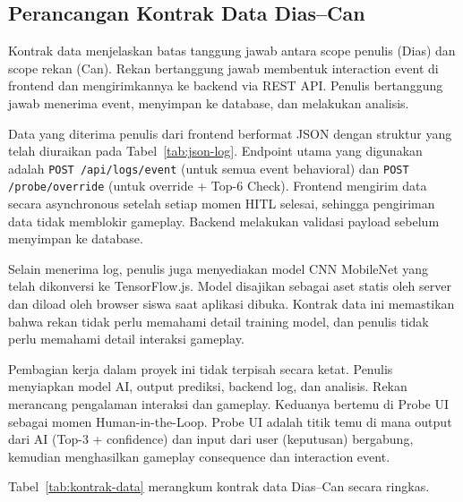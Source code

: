 \documentclass[12pt,a4paper,oneside,openany]{report}
\begin{document}
\subsection{Perancangan Kontrak Data Dias--Can}
\label{subsec:kontrak-data}

Kontrak data menjelaskan batas tanggung jawab antara scope penulis (Dias) dan scope rekan (Can). Rekan bertanggung jawab membentuk interaction event di frontend dan mengirimkannya ke backend via REST API. Penulis bertanggung jawab menerima event, menyimpan ke database, dan melakukan analisis.

Data yang diterima penulis dari frontend berformat JSON dengan struktur yang telah diuraikan pada Tabel~\ref{tab:json-log}. Endpoint utama yang digunakan adalah \texttt{POST /api/logs/event} (untuk semua event behavioral) dan \texttt{POST /probe/override} (untuk override + Top-6 Check). Frontend mengirim data secara asynchronous setelah setiap momen HITL selesai, sehingga pengiriman data tidak memblokir gameplay. Backend melakukan validasi payload sebelum menyimpan ke database.

Selain menerima log, penulis juga menyediakan model CNN MobileNet yang telah dikonversi ke TensorFlow.js. Model disajikan sebagai aset statis oleh server dan diload oleh browser siswa saat aplikasi dibuka. Kontrak data ini memastikan bahwa rekan tidak perlu memahami detail training model, dan penulis tidak perlu memahami detail interaksi gameplay.

Pembagian kerja dalam proyek ini tidak terpisah secara ketat. Penulis menyiapkan model AI, output prediksi, backend log, dan analisis. Rekan merancang pengalaman interaksi dan gameplay. Keduanya bertemu di Probe UI sebagai momen Human-in-the-Loop. Probe UI adalah titik temu di mana output dari AI (Top-3 + confidence) dan input dari user (keputusan) bergabung, kemudian menghasilkan gameplay consequence dan interaction event.

Tabel~\ref{tab:kontrak-data} merangkum kontrak data Dias--Can secara ringkas.
\end{document}

